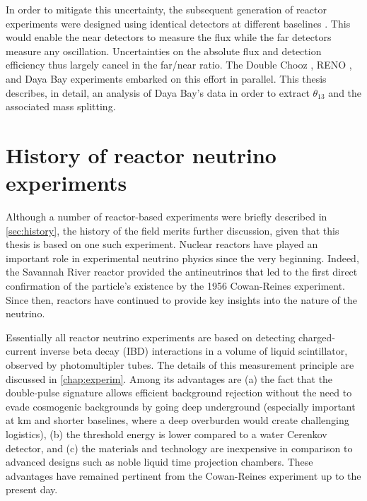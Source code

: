 \documentclass[../thesis.tex]{subfiles}
\begin{document}
In order to mitigate this uncertainty, the subsequent generation of reactor experiments were designed using identical detectors at different baselines \cite{Mikaelyan:1998yg}. This would enable the near detectors to measure the flux while the far detectors measure any oscillation. Uncertainties on the absolute flux and detection efficiency thus largely cancel in the far/near ratio. The Double Chooz \cite{Ardellier:2006mn}, RENO \cite{Ahn:2010vy}, and Daya Bay \cite{Guo:2007ug} experiments embarked on this effort in parallel. This thesis describes, in detail, an analysis of Daya Bay's data in order to extract $\theta_{13}$ and the associated mass splitting.


\section{History of reactor neutrino experiments}
\label{sec:introReactor}

Although a number of reactor-based experiments were briefly described in \ref{sec:history}, the history of the field merits further discussion, given that this thesis is based on one such experiment. Nuclear reactors have played an important role in experimental neutrino physics since the very beginning. Indeed, the Savannah River reactor provided the antineutrinos that led to the first direct confirmation of the particle's existence by the 1956 Cowan-Reines experiment. Since then, reactors have continued to provide key insights into the nature of the neutrino.

Essentially all reactor neutrino experiments are based on detecting charged-current inverse beta decay (IBD) interactions in a volume of liquid scintillator, observed by photomultipler tubes. The details of this measurement principle are discussed in \autoref{chap:experim}. Among its advantages are (a) the fact that the double-pulse signature allows efficient background rejection without the need to evade cosmogenic backgrounds by going deep underground (especially important at km and shorter baselines, where a deep overburden would create challenging logistics), (b) the threshold energy is lower compared to a water Cerenkov detector, and (c) the materials and technology are inexpensive in comparison to advanced designs such as noble liquid time projection chambers. These advantages have remained pertinent from the Cowan-Reines experiment up to the present day.
\end{document}
